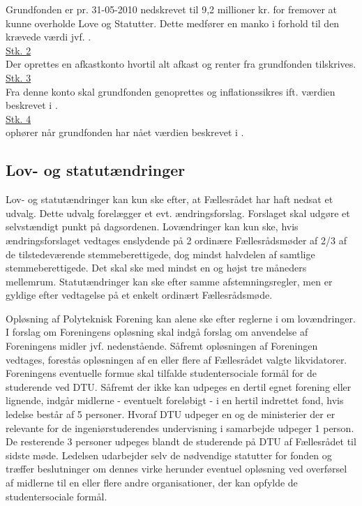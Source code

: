 \begin{list}
\item \label{L:Grundfond:9.2mio} Grundfonden er pr. 31-05-2010 nedskrevet til 9,2 millioner kr. for fremover at kunne overholde Love og Statutter. Dette medfører en manko i forhold til den krævede værdi jvf. .\\

\underline{Stk. 2}\\
Der oprettes en afkastkonto hvortil alt afkast og renter fra grundfonden tilskrives.\\

\underline{Stk. 3}\\
Fra denne konto skal grundfonden genoprettes og inflationssikres ift. værdien beskrevet i .\\


\underline{Stk. 4}\\
 ophører når grundfonden har nået værdien beskrevet i .
\subsection{Lov- og statutændringer}
\item \label{L:LS:aendringer} Lov- og statutændringer kan kun ske efter, at Fællesrådet har haft nedsat et udvalg. Dette udvalg forelægger et evt. ændringsforslag. Forslaget skal udgøre et selvstændigt punkt på dagsordenen. Lovændringer kan kun ske, hvis ændringsforslaget vedtages enslydende på 2 ordinære Fællesrådsmøder af 2/3 af de tilstedeværende stemmeberettigede, dog mindst halvdelen af samtlige stemmeberettigede. Det skal ske med mindst en og højst tre måneders mellemrum. Statutændringer kan ske efter samme afstemningsregler, men er gyldige efter vedtagelse på et enkelt ordinært Fællesrådsmøde.

\item Opløsning af Polyteknisk Forening kan alene ske efter reglerne i  om lovændringer. I forslag om Foreningens opløsning skal indgå forslag om anvendelse af Foreningens midler jvf. nedenstående. Såfremt opløsningen af Foreningen vedtages, forestås opløsningen af en eller flere af Fællesrådet valgte likvidatorer. Foreningens eventuelle formue skal tilfalde studentersociale formål for de studerende ved DTU. Såfremt der ikke kan udpeges en dertil egnet forening eller lignende, indgår midlerne - eventuelt foreløbigt - i en hertil indrettet fond, hvis ledelse består af 5 personer. Hvoraf DTU udpeger en og de ministerier der er relevante for de ingeniørstuderendes undervisning i samarbejde udpeger 1 person. De resterende 3 personer udpeges blandt de studerende på DTU af Fællesrådet til sidste møde. Ledelsen udarbejder selv de nødvendige statutter for fonden og træffer beslutninger om dennes virke herunder eventuel opløsning ved overførsel af midlerne til en eller flere andre organisationer, der kan opfylde de studentersociale formål.

\end{list}
